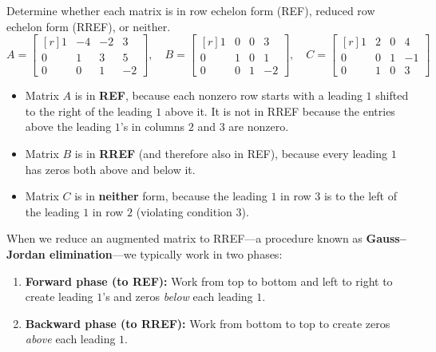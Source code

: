 \documentclass{article}
\begin{document}
\begin{example}\label{ex:rref-check}
Determine whether each matrix is in row echelon form (REF), reduced row echelon form (RREF), or neither.
\[
A = \begin{bmatrix*}[r]
1 & -4 & -2 & 3 \\
0 & 1 & 3 & 5 \\
0 & 0 & 1 & -2
\end{bmatrix*}, \quad
B = \begin{bmatrix*}[r]
1 & 0 & 0 & 3 \\
0 & 1 & 0 & 1 \\
0 & 0 & 1 & -2
\end{bmatrix*}, \quad
C = \begin{bmatrix*}[r]
1 & 2 & 0 & 4 \\
0 & 0 & 1 & -1 \\
0 & 1 & 0 & 3
\end{bmatrix*}
\]
\begin{itemize}
    \item Matrix \(A\) is in \textbf{REF}, because each nonzero row starts with a leading \(1\) shifted to the right of the leading \(1\) above it. It is not in RREF because the entries above the leading \(1\)'s in columns \(2\) and \(3\) are nonzero.
    \item Matrix \(B\) is in \textbf{RREF} (and therefore also in REF), because every leading \(1\) has zeros both above and below it.
    \item Matrix \(C\) is in \textbf{neither} form, because the leading \(1\) in row \(3\) is to the left of the leading \(1\) in row \(2\) (violating condition 3).
\end{itemize}
\end{example}

When we reduce an augmented matrix to RREF—a procedure known as \textbf{Gauss--Jordan elimination}—we typically work in two phases:
\begin{enumerate}
    \item \textbf{Forward phase (to REF):} Work from top to bottom and left to right to create leading \(1\)'s and zeros \emph{below} each leading \(1\).
    \item \textbf{Backward phase (to RREF):} Work from bottom to top to create zeros \emph{above} each leading \(1\).
\end{enumerate}
\end{document}
